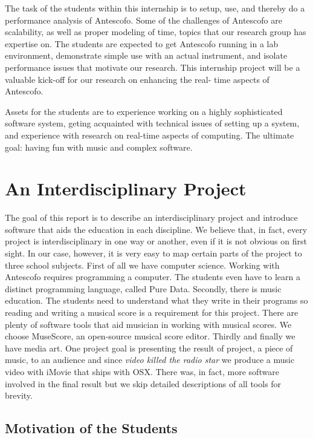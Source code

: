 \documentclass[onecolumn,nocopyrightspace,preprint]{sigplanconf}
\begin{document}
The task of the students within this internship is to setup, use, and thereby
do a performance analysis of Antescofo. Some of the challenges of Antescofo
are scalability, as well as proper modeling of time, topics that our research
group has expertise on. The students are expected to get Antescofo running in
a lab environment, demonstrate simple use with an actual instrument, and
isolate performance issues that motivate our research. This internship
project will be a valuable kick-off for our research on enhancing the real-
time aspects of Antescofo.

Assets for the students are to experience working on a highly sophisticated
software system, geting acquainted with technical issues of setting up a
system, and experience with research on real-time aspects of computing. The
ultimate goal: having fun with music and complex software.


\section{An Interdisciplinary Project}

The goal of this report is to describe an interdisciplinary project and
introduce software that aids the education in each discipline.  We believe
that, in fact, every project is interdisciplinary in one way or another, even
if it is not obvious on first sight. In our case, however, it is very easy to
map certain parts of the project to three school subjects. First of all we
have computer science. Working with Antescofo requires programming a computer.
The students even have to learn a distinct programming language, called Pure
Data. Secondly, there is music education. The students need to understand what
they write in their programs so reading and writing a musical score is a
requirement for this project. There are plenty of software tools that aid
musician in working with musical scores. We choose MuseScore, an open-source
musical score editor. Thirdly and finally we have media art. One project goal
is presenting the result of project, a piece of music, to an audience and
since \textit{video killed the radio star} we produce a music video with
iMovie that ships with OSX. There was, in fact, more software involved in the
final result but we skip detailed descriptions of all tools for brevity.


\subsection{Motivation of the Students}
\end{document}
